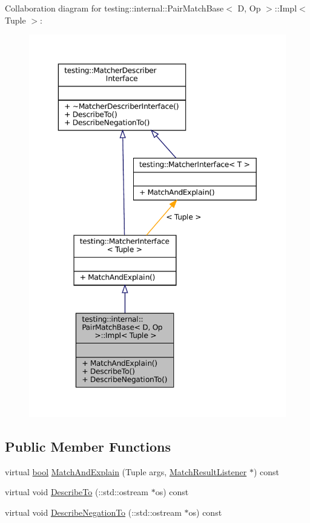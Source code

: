 Collaboration diagram for testing\+:\+:internal\+:\+:Pair\+Match\+Base$<$ D, Op $>$\+:\+:Impl$<$ Tuple $>$\+:
\nopagebreak
\begin{figure}[H]
\begin{center}
\leavevmode
\includegraphics[width=349pt]{classtesting_1_1internal_1_1PairMatchBase_1_1Impl__coll__graph}
\end{center}
\end{figure}
\subsection*{Public Member Functions}
\begin{DoxyCompactItemize}
\item 
virtual \hyperlink{classbool}{bool} \hyperlink{classtesting_1_1internal_1_1PairMatchBase_1_1Impl_abba39c0ceaf795ded3845af76af8772f}{Match\+And\+Explain} (Tuple args, \hyperlink{classtesting_1_1MatchResultListener}{Match\+Result\+Listener} $\ast$) const
\item 
virtual void \hyperlink{classtesting_1_1internal_1_1PairMatchBase_1_1Impl_a15875cb34c31a19a8decad64899fff3f}{Describe\+To} (\+::std\+::ostream $\ast$os) const
\item 
virtual void \hyperlink{classtesting_1_1internal_1_1PairMatchBase_1_1Impl_ac687a0bd4df52f60a25ef9bf31b269db}{Describe\+Negation\+To} (\+::std\+::ostream $\ast$os) const
\end{DoxyCompactItemize}


